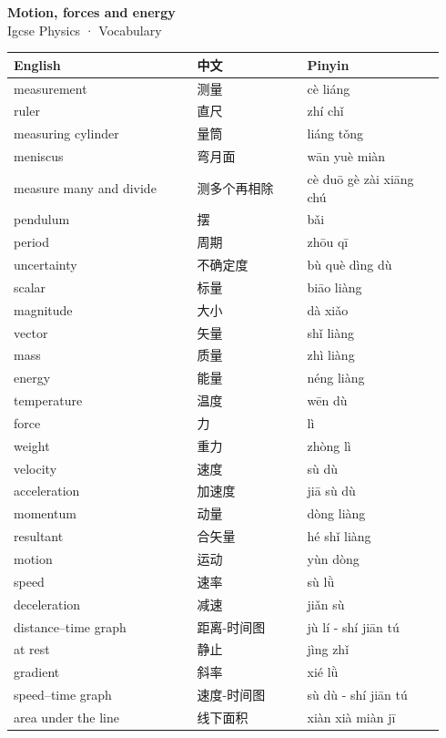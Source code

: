 \documentclass[11pt]{article}
\begin{document}
\begin{center}
  {\LARGE\bfseries Motion, forces and energy}\\[0.35em]
  {\large Igcse Physics · Vocabulary}
\end{center}
\vspace{0.6em}

\begin{longtable}{@{}p{0.40\linewidth}p{0.24\linewidth}p{0.30\linewidth}@{}}
\toprule
\textbf{English} & \textbf{中文} & \textbf{Pinyin} \\
\midrule
\endhead
\bottomrule
\endlastfoot
measurement & 测量 & cè liáng \\
ruler & 直尺 & zhí chǐ \\
measuring cylinder & 量筒 & liáng tǒng \\
meniscus & 弯月面 & wān yuè miàn \\
measure many and divide & 测多个再相除 & cè duō gè zài xiāng chú \\
pendulum & 摆 & bǎi \\
period & 周期 & zhōu qī \\
uncertainty & 不确定度 & bù què dìng dù \\
scalar & 标量 & biāo liàng \\
magnitude & 大小 & dà xiǎo \\
vector & 矢量 & shǐ liàng \\
mass & 质量 & zhì liàng \\
energy & 能量 & néng liàng \\
temperature & 温度 & wēn dù \\
force & 力 & lì \\
weight & 重力 & zhòng lì \\
velocity & 速度 & sù dù \\
acceleration & 加速度 & jiā sù dù \\
momentum & 动量 & dòng liàng \\
resultant & 合矢量 & hé shǐ liàng \\
motion & 运动 & yùn dòng \\
speed & 速率 & sù lǜ \\
deceleration & 减速 & jiǎn sù \\
distance–time graph & 距离-时间图 & jù lí - shí jiān tú \\
at rest & 静止 & jìng zhǐ \\
gradient & 斜率 & xié lǜ \\
speed–time graph & 速度-时间图 & sù dù - shí jiān tú \\
area under the line & 线下面积 & xiàn xià miàn jī \\

\end{longtable}
\end{document}
